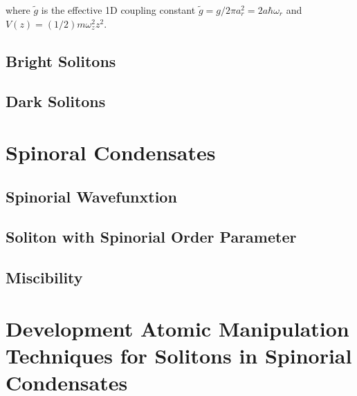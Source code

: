 \documentclass[../main.tex]{subfiles}
\begin{document}
where $\tilde{g}$ is the effective 1D coupling constant $\tilde{g} = g / 2\pi a_r^2 = 2a \hbar \omega_r$ and $V(z) = (1/2)m \omega_z^2 z^2$.


\subsection{Bright Solitons}


\subsection{Dark Solitons}


\section{Spinoral Condensates}

\subsection{Spinorial Wavefunxtion}

\subsection{Soliton with Spinorial Order Parameter}

\subsection{Miscibility}


\section{Development Atomic Manipulation Techniques for Solitons in Spinorial Condensates}
\end{document}
